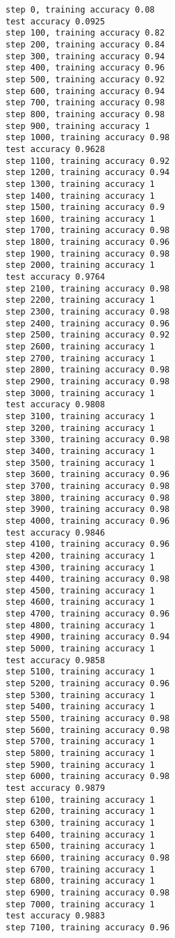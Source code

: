 \documentclass[11pt]{article}
\begin{document}
    \begin{Verbatim}[commandchars=\\\{\}]
step 0, training accuracy 0.08
test accuracy 0.0925
step 100, training accuracy 0.82
step 200, training accuracy 0.84
step 300, training accuracy 0.94
step 400, training accuracy 0.96
step 500, training accuracy 0.92
step 600, training accuracy 0.94
step 700, training accuracy 0.98
step 800, training accuracy 0.98
step 900, training accuracy 1
step 1000, training accuracy 0.98
test accuracy 0.9628
step 1100, training accuracy 0.92
step 1200, training accuracy 0.94
step 1300, training accuracy 1
step 1400, training accuracy 1
step 1500, training accuracy 0.9
step 1600, training accuracy 1
step 1700, training accuracy 0.98
step 1800, training accuracy 0.96
step 1900, training accuracy 0.98
step 2000, training accuracy 1
test accuracy 0.9764
step 2100, training accuracy 0.98
step 2200, training accuracy 1
step 2300, training accuracy 0.98
step 2400, training accuracy 0.96
step 2500, training accuracy 0.92
step 2600, training accuracy 1
step 2700, training accuracy 1
step 2800, training accuracy 0.98
step 2900, training accuracy 0.98
step 3000, training accuracy 1
test accuracy 0.9808
step 3100, training accuracy 1
step 3200, training accuracy 1
step 3300, training accuracy 0.98
step 3400, training accuracy 1
step 3500, training accuracy 1
step 3600, training accuracy 0.96
step 3700, training accuracy 0.98
step 3800, training accuracy 0.98
step 3900, training accuracy 0.98
step 4000, training accuracy 0.96
test accuracy 0.9846
step 4100, training accuracy 0.96
step 4200, training accuracy 1
step 4300, training accuracy 1
step 4400, training accuracy 0.98
step 4500, training accuracy 1
step 4600, training accuracy 1
step 4700, training accuracy 0.96
step 4800, training accuracy 1
step 4900, training accuracy 0.94
step 5000, training accuracy 1
test accuracy 0.9858
step 5100, training accuracy 1
step 5200, training accuracy 0.96
step 5300, training accuracy 1
step 5400, training accuracy 1
step 5500, training accuracy 0.98
step 5600, training accuracy 0.98
step 5700, training accuracy 1
step 5800, training accuracy 1
step 5900, training accuracy 1
step 6000, training accuracy 0.98
test accuracy 0.9879
step 6100, training accuracy 1
step 6200, training accuracy 1
step 6300, training accuracy 1
step 6400, training accuracy 1
step 6500, training accuracy 1
step 6600, training accuracy 0.98
step 6700, training accuracy 1
step 6800, training accuracy 1
step 6900, training accuracy 0.98
step 7000, training accuracy 1
test accuracy 0.9883
step 7100, training accuracy 0.96

\end{Verbatim}
\end{document}
